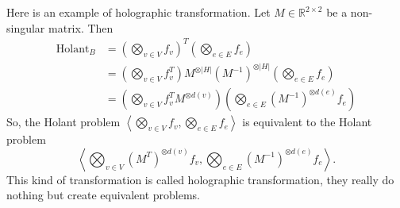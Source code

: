 \documentclass{article}
\def\<{\left\langle}
\def\>{\right\rangle}
\begin{document}
Here is an example of holographic transformation.
Let $M \in \mathbb{R}^{2\times 2}$ be a non-singular matrix.
Then 
\begin{align*}
  \mathrm{Holant}_B
  &= \left(\bigotimes_{v\in V} f_v\right)^T\left(\bigotimes_{e\in E} f_e\right) \\
  &= \left(\bigotimes_{v\in V} f_v^T\right) M^{\otimes |H|} (M^{-1})^{\otimes |H|}\left(\bigotimes_{e\in E} f_e\right) \\
  &= \left(\bigotimes_{v \in V} f_v^T M^{\otimes d(v)}\right) \left(\bigotimes_{e\in E} (M^{-1})^{\otimes d(e)}f_e\right)
\end{align*}
So, the Holant problem $\<\bigotimes_{v\in V}f_v, \bigotimes_{e\in E} f_e\>$ is equivalent to the Holant problem \[\<\bigotimes_{v\in V} (M^T)^{\otimes d(v)}f_v, \bigotimes_{e\in E} (M^{-1})^{\otimes d(e)} f_e\>.\]
This kind of transformation is called holographic transformation, they really do nothing but create equivalent problems.
\end{document}

